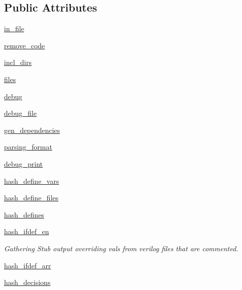 \subsection*{Public Attributes}
\begin{DoxyCompactItemize}
\item 
\hyperlink{classsrc_1_1codegen_1_1codegen_a924b875eb5083c8e386a7c511062ec54}{in\-\_\-file}
\item 
\hyperlink{classsrc_1_1codegen_1_1codegen_a99a93980ce41f26c98d7310e896683e8}{remove\-\_\-code}
\item 
\hyperlink{classsrc_1_1codegen_1_1codegen_a52709f08304690031810bc906e79ee04}{incl\-\_\-dirs}
\item 
\hyperlink{classsrc_1_1codegen_1_1codegen_a0a7d1f62b91579d6cacc4051ab710f9d}{files}
\item 
\hyperlink{classsrc_1_1codegen_1_1codegen_a1dc7058a4be04c25dbeda35f53ad6561}{debug}
\item 
\hyperlink{classsrc_1_1codegen_1_1codegen_a7b9958156cd5e9db7a5065e37d8c2e3e}{debug\-\_\-file}
\item 
\hyperlink{classsrc_1_1codegen_1_1codegen_af63c5fcc7e7d1d62c3d7860151e68e4c}{gen\-\_\-dependencies}
\item 
\hyperlink{classsrc_1_1codegen_1_1codegen_a58d96416c95cad22a87488d65fb6fef5}{parsing\-\_\-format}
\item 
\hyperlink{classsrc_1_1codegen_1_1codegen_a2b49150564c96b7417c676c7e71f3ee3}{debug\-\_\-print}
\item 
\hyperlink{classsrc_1_1codegen_1_1codegen_a6566d2de6d4841695e4f1ef3eb89b8e9}{hash\-\_\-define\-\_\-vars}
\item 
\hyperlink{classsrc_1_1codegen_1_1codegen_a060c03d571c3d2aeb4cae7c50b1f23f9}{hash\-\_\-define\-\_\-files}
\item 
\hyperlink{classsrc_1_1codegen_1_1codegen_a8c1fbafee413be6472edfa3086744088}{hash\-\_\-defines}
\item 
\hyperlink{classsrc_1_1codegen_1_1codegen_a0d57c346d2836db9ede8bba7d2a94fdf}{hash\-\_\-ifdef\-\_\-en}
\begin{DoxyCompactList}\small\item\em Gathering Stub output overriding vals from verilog files that are commented. \end{DoxyCompactList}\item 
\hyperlink{classsrc_1_1codegen_1_1codegen_acc991347bbd3ec540567af9f2f45badd}{hash\-\_\-ifdef\-\_\-arr}
\item 
\hyperlink{classsrc_1_1codegen_1_1codegen_a235daa673c6d109632947f82e699b23d}{hash\-\_\-decisions}

\end{DoxyCompactItemize}
